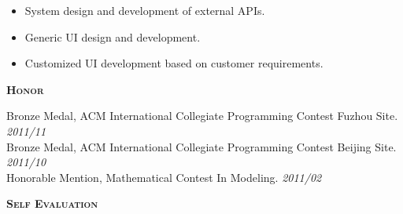 \documentclass[a4paper]{article}
\newenvironment{changemargin}[2]{%
  \begin{list}{}{%
    \setlength{\topsep}{0pt}%
    \setlength{\leftmargin}{#1}%
    \setlength{\rightmargin}{#2}%
    \setlength{\listparindent}{\parindent}%
    \setlength{\itemindent}{\parindent}%
    \setlength{\parsep}{\parskip}%
  }%
  \item[]}{\end{list}
}
\newcommand{\lineover}{
	\begin{changemargin}{-0.05in}{-0.05in}
		\vspace*{-8pt}
		\hrulefill \\
		\vspace*{-2pt}
	\end{changemargin}
}
\newcommand{\header}[1]{
	\begin{changemargin}{-0.5in}{-0.5in}
		\scshape{\large \textbf{#1}}\\
	\end{changemargin}
}
\newenvironment{body} {
	\vspace*{-16pt}
	\begin{changemargin}{-0.5in}{-0.5in}
  }
	{\end{changemargin}
}
\begin{document}
\begin{body}
	\vspace*{-8pt}
	\begin{itemize} \itemsep -0pt  %
		\item \begin{justify} 
			System design and development of external APIs.
		\end{justify} 
	\end{itemize}

	\vspace*{-8pt}
	\begin{itemize} \itemsep -0pt  %
		\item \begin{justify} 
			Generic UI design and development.
		\end{justify} 
	\end{itemize}

	\vspace*{-8pt}
	\begin{itemize} \itemsep -0pt  %
		\item \begin{justify} 
			Customized UI development based on customer requirements.
		\end{justify} 
	\end{itemize}

\end{body}
\medskip

\header{Honor}
\begin{body}
	\vspace{16pt}
	Bronze Medal, ACM International Collegiate Programming Contest Fuzhou Site. \hfill \emph{2011/11}\\
	Bronze Medal, ACM International Collegiate Programming Contest Beijing Site. \hfill \emph{2011/10}\\
	Honorable Mention, Mathematical Contest In Modeling. \hfill \emph{2011/02}\\
\end{body}

\medskip


\header{Self Evaluation}
\end{document}
